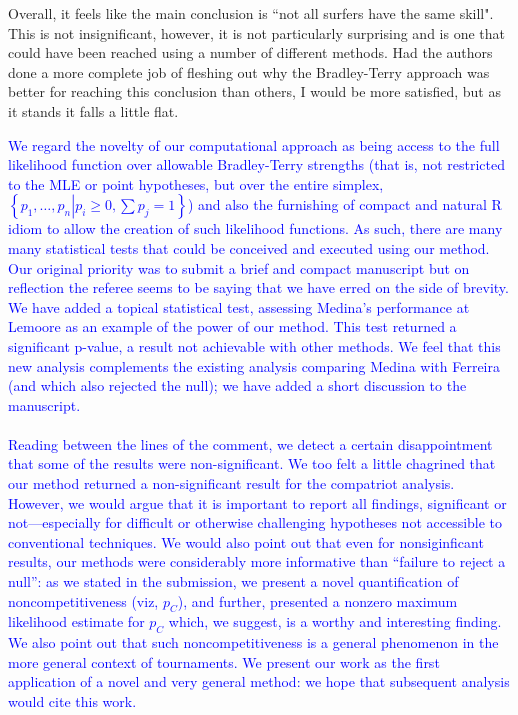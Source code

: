 \documentclass[12pt]{article}
\begin{document}
Overall, it feels like the main conclusion is ``not all surfers have
the same skill". This is not insignificant, however, it is not
particularly surprising and is one that could have been reached using
a number of different methods. Had the authors done a more complete
job of fleshing out why the Bradley-Terry approach was better for
reaching this conclusion than others, I would be more satisfied, but
as it stands it falls a little flat.

\textcolor{blue}{We regard the novelty of our computational approach
  as being access to the full likelihood function over allowable
  Bradley-Terry strengths (that is, not restricted to the MLE or point
  hypotheses, but over the entire simplex, $\left\lbrace
  p_1,\ldots,p_n\left|p_i\geq 0,\sum p_j=1\right.\right\rbrace$) and
  also the furnishing of compact and natural R idiom to allow the
  creation of such likelihood functions.  As such, there are many many
  statistical tests that could be conceived and executed using our
  method.  Our original priority was to submit a brief and compact
  manuscript but on reflection the referee seems to be saying that we
  have erred on the side of brevity.  We have added a topical
  statistical test, assessing Medina's performance at Lemoore as an
  example of the power of our method.  This test returned a
  significant p-value, a result not achievable with other methods.  We
  feel that this new analysis complements the existing analysis
  comparing Medina with Ferreira (and which also rejected the null);
  we have added a short discussion to the manuscript.  \\ \\ Reading
  between the lines of the comment, we detect a certain disappointment
  that some of the results were non-significant.  We too felt a little
  chagrined that our method returned a non-significant result for the
  compatriot analysis.  However, we would argue that it is important
  to report all findings, significant or not---especially for
  difficult or otherwise challenging hypotheses not accessible to
  conventional techniques.  We would also point out that even for
  nonsiginficant results, our methods were considerably more
  informative than ``failure to reject a null'': as we stated in the
  submission, we present a novel quantification of noncompetitiveness
  (viz, $p_C$), and further, presented a nonzero maximum likelihood
  estimate for $p_C$ which, we suggest, is a worthy and interesting
  finding.  We also point out that such noncompetitiveness is a
  general phenomenon in the more general context of tournaments.  We
  present our work as the first application of a novel and very
  general method: we hope that subsequent analysis would cite this
  work.}
\end{document}
